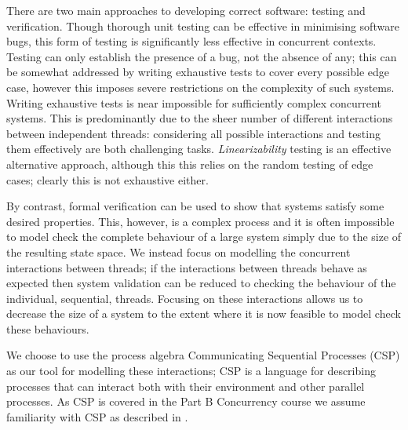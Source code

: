 There are two main approaches to developing correct software: testing and verification. Though thorough unit testing can be effective in minimising software bugs\cite{MicroTest}, this form of testing is significantly less effective in concurrent contexts. Testing can only establish the presence of a bug, not the absence of any; this can be somewhat addressed by writing exhaustive tests to cover every possible edge case, however this imposes severe restrictions on the complexity of such systems. Writing exhaustive tests is near impossible for sufficiently complex concurrent systems. This is predominantly due to the sheer number of different interactions between independent threads: considering all possible interactions and testing them effectively are both challenging tasks.
\emph{Linearizability} testing is an effective alternative approach, although this this relies on the random testing of edge cases; clearly this is not exhaustive either\cite{LoweLin}.

By contrast, formal verification can be used to show that systems satisfy some desired properties\cite{PrinciplesOfModelChecking}. This, however, is a complex process and it is often impossible to model check the complete behaviour of a large system simply due to the size of the resulting state space. 
We instead focus on modelling the concurrent interactions between threads; if the interactions between threads behave as expected then system validation can be reduced to checking the behaviour of the individual, sequential, threads.
Focusing on these interactions allows us to decrease the size of a system to the extent where it is now feasible to model check these behaviours. 

We choose to use the process algebra Communicating Sequential Processes (CSP) as our tool for modelling these interactions; CSP is a language for describing processes that can interact both with their environment and other parallel processes. As CSP is covered in the Part B Concurrency course\cite{Concurrency} we assume familiarity with CSP as described in \cite{Roscoe}.



